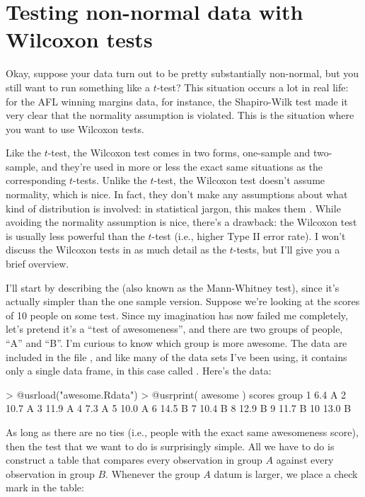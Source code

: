 \section{Testing non-normal data with Wilcoxon tests\label{sec:wilcox}}

Okay, suppose your data turn out to be pretty substantially non-normal, but you still want to run something like a $t$-test? This situation occurs a lot in real life: for the AFL winning margins data, for instance, the Shapiro-Wilk test made it very clear that the normality assumption is violated. This is the situation where you want to use Wilcoxon tests. 

Like the $t$-test, the Wilcoxon test comes in two forms, one-sample and two-sample, and they're used in more or less the exact same situations as the corresponding $t$-tests. Unlike the $t$-test, the Wilcoxon test doesn't assume normality, which is nice. In fact, they don't make any assumptions about what kind of distribution is involved: in statistical jargon, this makes them . While avoiding the normality assumption is nice, there's a drawback: the Wilcoxon test is usually less powerful than the $t$-test (i.e., higher Type II error rate). I won't discuss the Wilcoxon tests in as much detail as the $t$-tests, but I'll give you a brief overview.



I'll start by describing the  (also known as the Mann-Whitney test), since it's actually simpler than the one sample version. Suppose we're looking at the scores of 10 people on some test. Since my imagination has now failed me completely, let's pretend it's a ``test of awesomeness'', and there are two groups of people, ``A'' and ``B''. I'm curious to know which group is more awesome. The data are included in the file , and like many of the data sets I've been using, it contains only a single data frame, in this case called . Here's the data:
\begin{rblock1}
> @usr{load("awesome.Rdata")}
> @usr{print( awesome )}
   scores group
1     6.4     A
2    10.7     A
3    11.9     A
4     7.3     A
5    10.0     A
6    14.5     B
7    10.4     B
8    12.9     B
9    11.7     B
10   13.0     B
\end{rblock1}
As long as there are no ties (i.e., people with the exact same awesomeness score), then the test that we want to do is surprisingly simple. All we have to do is construct a table that compares every observation in group $A$ against every observation in group $B$. Whenever the group $A$ datum is larger, we place a check mark in the table:


